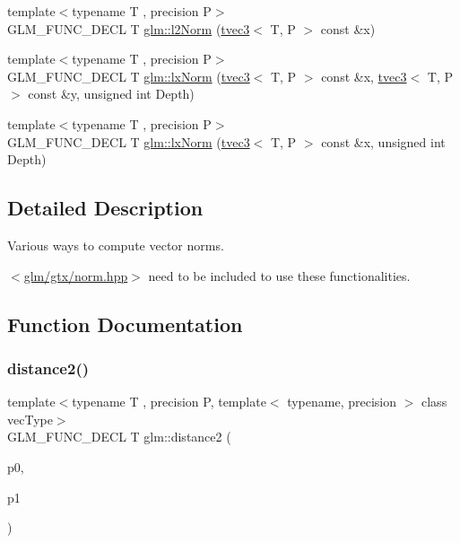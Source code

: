 \begin{DoxyCompactItemize}
{\footnotesize template$<$typename T , precision P$>$ }\\G\+L\+M\+\_\+\+F\+U\+N\+C\+\_\+\+D\+E\+CL T \hyperlink{group__gtx__norm_ga0a8cb8a0ce88d1d977de23209bf04610}{glm\+::l2\+Norm} (\hyperlink{structglm_1_1tvec3}{tvec3}$<$ T, P $>$ const \&x)
\item 
{\footnotesize template$<$typename T , precision P$>$ }\\G\+L\+M\+\_\+\+F\+U\+N\+C\+\_\+\+D\+E\+CL T \hyperlink{group__gtx__norm_ga932bb0854e5c5a6ab5a14b023c451ca7}{glm\+::lx\+Norm} (\hyperlink{structglm_1_1tvec3}{tvec3}$<$ T, P $>$ const \&x, \hyperlink{structglm_1_1tvec3}{tvec3}$<$ T, P $>$ const \&y, unsigned int Depth)
\item 
{\footnotesize template$<$typename T , precision P$>$ }\\G\+L\+M\+\_\+\+F\+U\+N\+C\+\_\+\+D\+E\+CL T \hyperlink{group__gtx__norm_gaab931b0d1acfe2f9c1cb78311edf24fc}{glm\+::lx\+Norm} (\hyperlink{structglm_1_1tvec3}{tvec3}$<$ T, P $>$ const \&x, unsigned int Depth)
\end{DoxyCompactItemize}


\subsection{Detailed Description}
Various ways to compute vector norms. 

$<$\hyperlink{norm_8hpp}{glm/gtx/norm.\+hpp}$>$ need to be included to use these functionalities. 

\subsection{Function Documentation}
\mbox{\label{group__gtx__norm_ga647d2602008801d6ed78f9708eb439cc}} 
\subsubsection{\texorpdfstring{distance2()}{distance2()}}
{\footnotesize\ttfamily template$<$typename T , precision P, template$<$ typename, precision $>$ class vec\+Type$>$ \\
G\+L\+M\+\_\+\+F\+U\+N\+C\+\_\+\+D\+E\+CL T glm\+::distance2 (\begin{DoxyParamCaption}\item[{vec\+Type$<$ T, P $>$ const \&}]{p0,  }\item[{vec\+Type$<$ T, P $>$ const \&}]{p1 }\end{DoxyParamCaption})}

